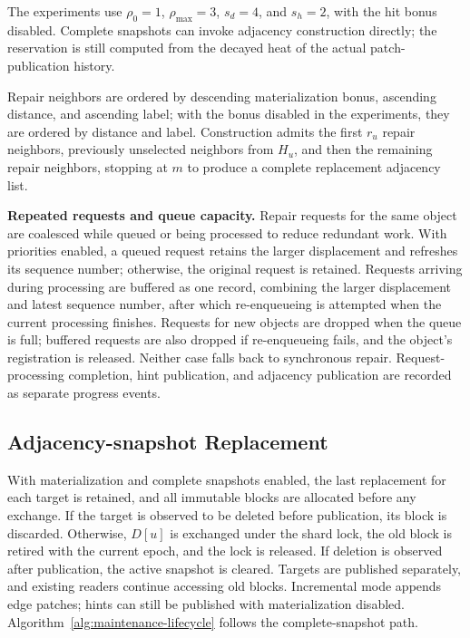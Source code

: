 \documentclass[sigconf,pbalance]{acmart}
\begin{document}
The experiments use $\rho_0=1$, $\rho_{\max}=3$, $s_d=4$, and $s_h=2$, with the hit bonus disabled. Complete snapshots can invoke adjacency construction directly; the reservation is still computed from the decayed heat of the actual patch-publication history.

Repair neighbors are ordered by descending materialization bonus, ascending distance, and ascending label; with the bonus disabled in the experiments, they are ordered by distance and label. Construction admits the first $r_u$ repair neighbors, previously unselected neighbors from $H_u$, and then the remaining repair neighbors, stopping at $m$ to produce a complete replacement adjacency list.

\textbf{Repeated requests and queue capacity.} Repair requests for the same object are coalesced while queued or being processed to reduce redundant work. With priorities enabled, a queued request retains the larger displacement and refreshes its sequence number; otherwise, the original request is retained. Requests arriving during processing are buffered as one record, combining the larger displacement and latest sequence number, after which re-enqueueing is attempted when the current processing finishes. Requests for new objects are dropped when the queue is full; buffered requests are also dropped if re-enqueueing fails, and the object's registration is released. Neither case falls back to synchronous repair. Request-processing completion, hint publication, and adjacency publication are recorded as separate progress events.

\subsection{Adjacency-snapshot Replacement}
\label{sec:adjacency-delta}

With materialization and complete snapshots enabled, the last replacement for each target is retained, and all immutable blocks are allocated before any exchange. If the target is observed to be deleted before publication, its block is discarded. Otherwise, $D[u]$ is exchanged under the shard lock, the old block is retired with the current epoch, and the lock is released. If deletion is observed after publication, the active snapshot is cleared. Targets are published separately, and existing readers continue accessing old blocks. Incremental mode appends edge patches; hints can still be published with materialization disabled. Algorithm~\ref{alg:maintenance-lifecycle} follows the complete-snapshot path.
\end{document}
